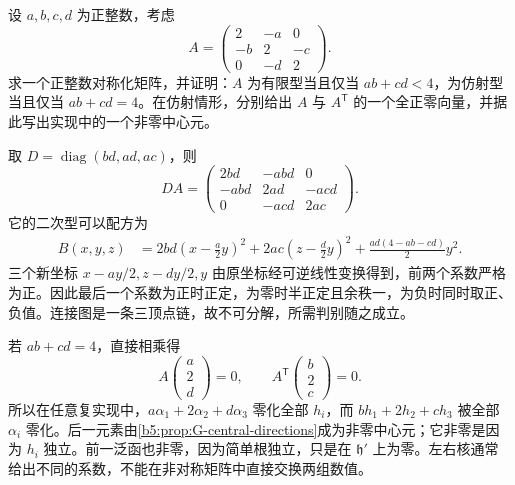 \begin{exercise}\label{b5:ex:G-three-vertex-chain}
	设 \(a,b,c,d\) 为正整数，考虑
	\[
		A=\begin{pmatrix}2&-a&0\\-b&2&-c\\0&-d&2\end{pmatrix}.
	\]
	求一个正整数对称化矩阵，并证明：\(A\) 为有限型当且仅当 \(ab+cd<4\)，为仿射型当且仅当 \(ab+cd=4\)。在仿射情形，分别给出 \(A\) 与 \(A^{\mathsf T}\) 的一个全正零向量，并据此写出实现中的一个非零中心元。
\end{exercise}
\begin{solution}
	取 \(D=\operatorname{diag}(bd,ad,ac)\)，则
	\[
		DA=\begin{pmatrix}2bd&-abd&0\\-abd&2ad&-acd\\0&-acd&2ac\end{pmatrix}.
	\]
	它的二次型可以配方为
	\[
		\begin{aligned}
			B(x,y,z)
			&=2bd\left(x-\frac a2y\right)^2
			+2ac\left(z-\frac d2y\right)^2
			+\frac{ad(4-ab-cd)}2y^2.
		\end{aligned}
	\]
	三个新坐标 \(x-ay/2,z-dy/2,y\) 由原坐标经可逆线性变换得到，前两个系数严格为正。因此最后一个系数为正时正定，为零时半正定且余秩一，为负时同时取正、负值。连接图是一条三顶点链，故不可分解，所需判别随之成立。

	若 \(ab+cd=4\)，直接相乘得
	\[
		A\begin{pmatrix}a\\2\\d\end{pmatrix}=0,
		\qquad
		A^{\mathsf T}\begin{pmatrix}b\\2\\c\end{pmatrix}=0.
	\]
	所以在任意复实现中，\(a\alpha_1+2\alpha_2+d\alpha_3\) 零化全部 \(h_i\)，而 \(bh_1+2h_2+ch_3\) 被全部 \(\alpha_i\) 零化。后一元素由\cref{b5:prop:G-central-directions}成为非零中心元；它非零是因为 \(h_i\) 独立。前一泛函也非零，因为简单根独立，只是在 \(\mathfrak h'\) 上为零。左右核通常给出不同的系数，不能在非对称矩阵中直接交换两组数值。
\end{solution}

